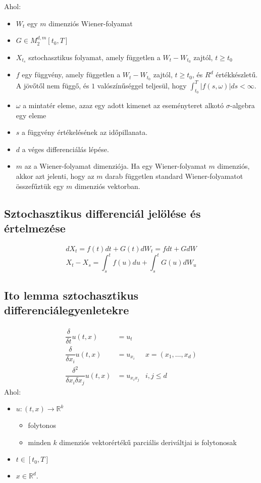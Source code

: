 \documentclass[11pt,a4paper]{article}
\begin{document}
					Ahol:
					\begin{itemize}
						\item $W_t$ egy $m$ dimenziós Wiener-folyamat
						\item $G \in M_2^{d,m}[t_0, T]$
						\item $X_{t_s}$ sztochasztikus folyamat, amely független a $W_t - W_{t_0}$ zajtól, $t \ge t_0$
						\item $f$ egy függvény, amely független a $W_t - W_{t_0}$ zajtól, $t \ge t_0$, és $R^d$ értékkészletű. A jövőtől nem függő, és $1$ valószínűséggel teljesül, hogy $\int_{t_0}^T |f(s, \omega)|ds < \infty$.
						\item $\omega$ a mintatér eleme, azaz egy adott kimenet az eseményteret alkotó $\sigma$-algebra egy eleme
						\item $s$ a függvény értékelésének az időpillanata.
						\item $d$ a véges differenciálás lépése.
						\item $m$ az a Wiener-folyamat dimenziója. Ha egy Wiener-folyamat $m$ dimenziós, akkor azt jelenti, hogy az $m$ darab független standard Wiener-folyamatot összefűztük egy $m$ dimenziós vektorban.
					\end{itemize}
					\subsection{Sztochasztikus differenciál jelölése és értelmezése}
						\paragraph{}
							$$dX_t = f(t)dt + G(t) dW_t = fdt + G dW$$
							$$X_t - X_s = \int_s^t f(u)du + \int_s^t G(u)dW_u$$
					\subsection{Ito lemma sztochasztikus differenciálegyenletekre}
						\paragraph{}
							$$
							\begin{aligned}
								\dfrac{\delta}{\delta t}u(t,x)&=u_t& \\
								\dfrac{\delta}{\delta x_i}u(t,x)&= u_{x_i} & x = (x_1, \dots, x_d) \\
								\dfrac{\delta^2}{\delta x_i \delta x_j} u(t,x) &= u_{x_i x_j} & i,j\le d
							\end{aligned}
							$$
							Ahol:
							\begin{itemize}
								\item $u:(t,x) \to \mathbb{R}^k$
								\begin{itemize}
									\item folytonos
									\item minden $k$ dimenziós vektorértékű parciális deriváltjai is folytonosak
									\end{itemize}
									\item $t \in [t_0, T]$
									\item $x \in \mathbb{R}^d$.
							\end{itemize}
\end{document}
